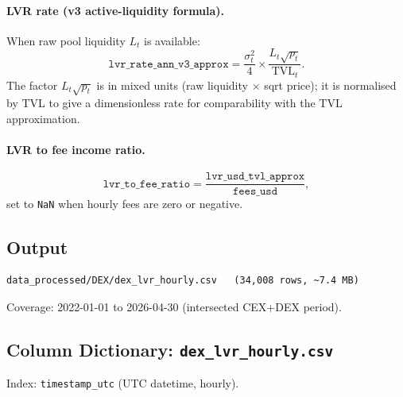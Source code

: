 \documentclass[11pt,a4paper]{article}
\begin{document}
\paragraph{LVR rate (v3 active-liquidity formula).}
When raw pool liquidity $L_t$ is available:
\[
  \texttt{lvr\_rate\_ann\_v3\_approx} =
  \frac{\sigma^2_t}{4} \times
  \frac{L_t \sqrt{p_t}}{\mathrm{TVL}_t}.
\]
The factor $L_t \sqrt{p_t}$ is in mixed units (raw liquidity $\times$
sqrt price); it is normalised by TVL to give a dimensionless rate for
comparability with the TVL approximation.

\paragraph{LVR to fee income ratio.}
\[
  \texttt{lvr\_to\_fee\_ratio} = \frac{\texttt{lvr\_usd\_tvl\_approx}}
  {\texttt{fees\_usd}},
\]
set to \texttt{NaN} when hourly fees are zero or negative.

\subsection{Output}

\begin{lstlisting}
data_processed/DEX/dex_lvr_hourly.csv   (34,008 rows, ~7.4 MB)
\end{lstlisting}

Coverage: 2022-01-01 to 2026-04-30 (intersected CEX+DEX period).

\subsection{Column Dictionary: \texttt{dex\_lvr\_hourly.csv}}

Index: \texttt{timestamp\_utc} (UTC datetime, hourly).
\end{document}
